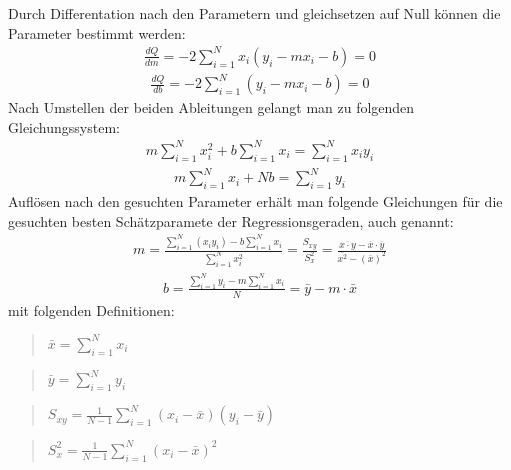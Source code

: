 \documentclass[letterpaper,10pt,english]{jupyterBook}
\begin{document}
\sphinxAtStartPar
Durch Differentation nach den Parametern und gleichsetzen auf Null können die Parameter bestimmt werden:
\begin{equation*}
\begin{split}\frac{dQ}{dm} = -2 \sum_{i = 1}^{N} x_i (y_i - mx_i - b) = 0\end{split}
\end{equation*}\begin{equation*}
\begin{split}\frac{dQ}{db} = -2 \sum_{i = 1}^{N} (y_i - mx_i - b) = 0\end{split}
\end{equation*}
\sphinxAtStartPar
Nach Umstellen der beiden Ableitungen gelangt man zu folgenden Gleichungssystem:
\begin{equation*}
\begin{split}m\sum_{i = 1}^{N} x_i^2 + b\sum_{i = 1}^{N}x_i  = \sum_{i = 1}^{N}x_i y_i\end{split}
\end{equation*}\begin{equation*}
\begin{split}m\sum_{i = 1}^{N} x_i + N b  = \sum_{i = 1}^{N} y_i\end{split}
\end{equation*}
\sphinxAtStartPar
Auflösen nach den gesuchten Parameter erhält man folgende Gleichungen für die gesuchten besten Schätzparamete der Regressionsgeraden, auch  genannt:
\begin{equation*}
\begin{split} m = \frac{\sum_{i=1}^N (x_i y_i) - b\sum_{i=1}^N x_i }{\sum_{i=1}^N x_i^2 } = \frac{S_{xy}}{S_{x}^2} = \frac{\overline{x\cdot y} - \overline x \cdot \overline y}{\overline{x^2} - (\overline x)^2}\end{split}
\end{equation*}\begin{equation*}
\begin{split}b = \frac{\sum_{i=1}^N y_i - m \sum_{i=1}^N x_i}{N} = \bar y - m \cdot \bar x\end{split}
\end{equation*}
\sphinxAtStartPar
mit folgenden Definitionen:
\begin{quote}

\sphinxAtStartPar
\(\bar x = \sum_{i = 1}^N x_i\)
\end{quote}
\begin{quote}

\sphinxAtStartPar
\(\bar y = \sum_{i = 1}^N y_i\)
\end{quote}
\begin{quote}

\sphinxAtStartPar
\(S_{xy} = \frac{1}{N-1}\sum_{i = 1}^N (x_i-\bar x)(y_i - \bar y)\)
\end{quote}
\begin{quote}

\sphinxAtStartPar
\(S_{x}^2 = \frac{1}{N-1}\sum_{i = 1}^N (x_i-\bar x)^2\)
\end{quote}
\end{document}
